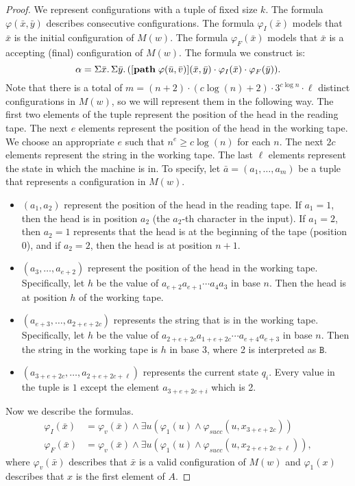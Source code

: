 \begin{proof}
	We represent configurations with a tuple of fixed size $k$. The formula $\varphi(\bar{x},\bar{y})$ describes consecutive configurations. The formula $\varphi_I(\bar{x})$ models that $\bar{x}$ is the initial configuration of $M(w)$. The formula $\varphi_F(\bar{x})$ models that $\bar{x}$ is a accepting (final) configuration of $M(w)$. The formula we construct is:
	$$
	\alpha = \Sigma{\bar{x}}.\,\Sigma{\bar{y}}.\,([{\bf path} \; \varphi(\bar{u},\bar{v})](\bar{x},\bar{y})\cdot \varphi_I(\bar{x})\cdot\varphi_F(\bar{y})).
	$$
	Note that there is a total of $m = (n+2)\cdot (c\log(n)+2)\cdot 3^{c\log n} \cdot \ell$ distinct configurations in $M(w)$, so we will represent them in the following way. The first two elements of the tuple represent the position of the head in the reading tape. The next $e$ elements represent the position of the head in the working tape. We choose an appropriate $e$ such that $n^e \geq c\log(n)$ for each $n$. The next $2c$ elements represent the string in the working tape. The last $\ell$ elements represent the state in which the machine is in. To specify, let $\bar{a} = (a_1,\ldots,a_m)$ be a tuple that represents a configuration in $M(w)$.
	\begin{itemize}
	\item $(a_1,a_2)$ represent the position of the head in the reading tape. If $a_1 = 1$, then the head is in position $a_2$ (the $a_2$-th character in the input). If $a_1 = 2$, then $a_2 = 1$ represents that the head is at the beginning of the tape (position 0), and if $a_2 = 2$, then the head is at position $n+1$.
	\item $(a_3,\ldots,a_{e+2})$ represent the position of the head in the working tape. Specifically, let $h$ be the value of $a_{e+2}a_{e+1}\cdots a_4 a_3$ in base $n$. Then the head is at position $h$ of the working tape.
	\item $(a_{e+3},\ldots,a_{2+e+2c})$ represents the string that is in the working tape. Specifically, let $h$ be the value of $a_{2+e+2c}a_{1+e+2c}\cdots a_{e+4}a_{e+3}$ in base $n$. Then the string in the working tape is $h$ in base 3, where 2 is interpreted as $\texttt{B}$.
	\item $(a_{3+e+2c},\ldots,a_{2+e+2c+\ell})$ represents the current state $q_i$. Every value in the tuple is $1$ except the element $a_{3+e+2c+i}$ which is 2.
	\end{itemize}
	Now we describe the formulas.
	\begin{align*}
	\varphi_I(\bar{x}) &= \varphi_v(\bar{x}) \wedge \exists u(\varphi_1(u) \wedge \varphi_{succ}(u,x_{3+e+2c})) \\
	\varphi_F(\bar{x}) &= \varphi_v(\bar{x}) \wedge \exists u(\varphi_1(u) \wedge \varphi_{succ}(u,x_{2+e+2c+\ell})),
	\end{align*}
	where $\varphi_v(\bar{x})$ describes that $\bar{x}$ is a valid configuration of $M(w)$ and $\varphi_1(x)$ describes that $x$ is the first element of $A$.
\end{proof}

